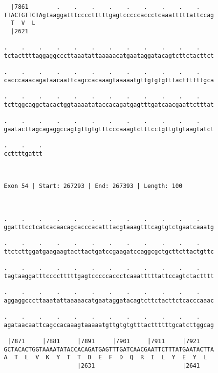 \documentclass{article}
\begin{document}
\begin{Verbatim}
  |7861        .    .    .    .    .    .    .    .    .    
TTACTGTTCTAgtaaggatttcccctttttgagtcccccaccctcaaatttttattccag
  T  V  L                                                   
  |2621                                                     
  
.    .    .    .    .    .    .    .    .    .    .    .    
tctacttttaggaggcccttaaatattaaaaacatgaataggatacagtcttctacttct
                                                            
.    .    .    .    .    .    .    .    .    .    .    .    
cacccaaacagataacaattcagccacaaagtaaaaatgttgtgtgtttacttttttgca
                                                            
.    .    .    .    .    .    .    .    .    .    .    .    
tcttggcaggctacactggtaaaatataccacagatgagtttgatcaacgaattctttat
                                                            
.    .    .    .    .    .    .    .    .    .    .    .    
gaatacttagcagaggccagtgttgtgtttcccaaagtctttcctgttgtgtaagtatct
                                                            
.    .    .
ccttttgattt
           
           
 
Exon 54 | Start: 267293 | End: 267393 | Length: 100



.    .    .    .    .    .    .    .    .    .    .    .    
ggatttcctcatcacaacagcacccacatttacgtaaagtttcagtgtctgaatcaaatg
                                                            
.    .    .    .    .    .    .    .    .    .    .    .    
ttctcttggatgaagaagtacttactgatccgaagatccaggcgctgcttcttactgttc
                                                            
.    .    .    .    .    .    .    .    .    .    .    .    
tagtaaggatttcccctttttgagtcccccaccctcaaatttttattccagtctactttt
                                                            
.    .    .    .    .    .    .    .    .    .    .    .    
aggaggcccttaaatattaaaaacatgaataggatacagtcttctacttctcacccaaac
                                                            
.    .    .    .    .    .    .    .    .    .    .    .    
agataacaattcagccacaaagtaaaaatgttgtgtgtttacttttttgcatcttggcag
                                                            
 |7871     |7881     |7891     |7901     |7911     |7921    
GCTACACTGGTAAAATATACCACAGATGAGTTTGATCAACGAATTCTTTATGAATACTTA
A  T  L  V  K  Y  T  T  D  E  F  D  Q  R  I  L  Y  E  Y  L  
                     |2631                         |2641    
  

\end{Verbatim}
\end{document}
